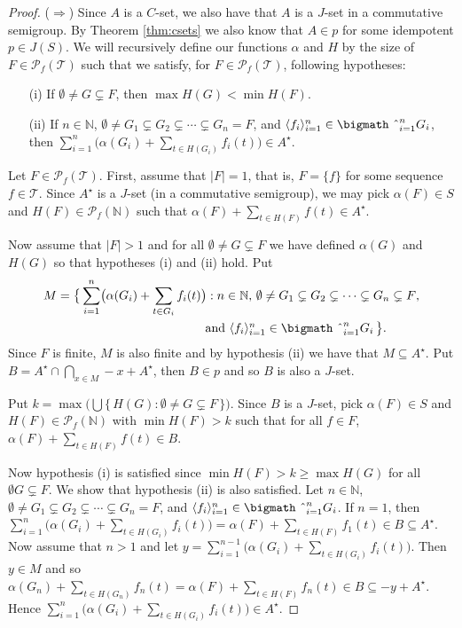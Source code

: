 \documentclass[12pt]{article}
\theoremstyle{plain}
\theoremstyle{definition}
\newcommand{\la}{\langle}
\newcommand{\ra}{\rangle}
\newcommand{\bbN}{\mathbb{N}}
\newcommand{\calT}{\mathcal{T}}
\newcommand{\Pf}{\mathcal{P}_f}
\newcommand{\bigtimes}{\hbox{\bigmath \char'2}}
\begin{document}
\begin{proof}
  ($\Rightarrow$)
  Since $A$ is a $C$-set, we also have that $A$ is a $J$-set in a commutative semigroup.
  By Theorem \ref{thm:csets} we also know that $A \in p$ for some idempotent $p \in J(S)$. 
  We will recursively define our functions $\alpha$ and $H$ by the size of $F \in \Pf(\calT)$ such that we satisfy, for $F \in \Pf(\calT)$, following hypotheses:
  \begin{itemize}
    \item[(i)] If $\emptyset \ne G \subsetneq F$, then $\max H(G) < \min H(F)$.
      
    \item[(ii)] If $n \in \bbN$, $\emptyset \ne G_1 \subsetneq G_2 \subsetneq \cdots \subsetneq G_n = F$, and $\la f_i \ra_{i=1}^n \in \bigtimes_{i=1}^n G_i$, then $\sum_{i=1}^n\bigl( \alpha(G_i) + \sum_{t \in H(G_i)} f_i(t)\bigr) \in A^\star$. 
  \end{itemize}
  
  Let $F \in \Pf(\calT)$.
  First, assume that $|F| = 1$, that is, $F = \{f\}$ for some sequence $f \in \calT$.
  Since $A^\star$ is a $J$-set (in a commutative semigroup), we may pick $\alpha(F) \in S$ and $H(F) \in \Pf(\bbN)$ such that $\alpha(F) + \sum_{t \in H(F)} f(t) \in A^\star$.

  Now assume that $|F| > 1$ and for all $\emptyset \ne G \subsetneq F$ we have defined $\alpha(G)$ and $H(G)$ so that hypotheses (i) and (ii) hold.
  Put
  \begin{align*}
    M &= \bigl\{\, \sum_{i=1}^n \bigl( \alpha(G_i) + \sum_{t \in G_i} f_i(t) \bigr) : \mbox{$n \in \bbN$, $\emptyset \ne G_1 \subsetneq G_2 \subsetneq \cdots \subsetneq G_n \subsetneq F$,} \\
    &\hspace{12em} \mbox{and $\la f_i \ra_{i=1}^n \in \bigtimes_{i=1}^n G_i$} \,\bigr\}.
  \end{align*}
  Since $F$ is finite, $M$ is also finite and by hypothesis (ii) we have that $M \subseteq A^\star$.
  Put $B = A^\star \cap \bigcap_{x \in M} -x+A^\star$, then $B \in p$ and so $B$ is also a $J$-set.

  Put $k = \max \bigl( \bigcup\{\, H(G) : \emptyset \ne G \subsetneq F\,\} \bigr)$.
  Since $B$ is a $J$-set, pick $\alpha(F) \in S$ and $H(F) \in \Pf(\bbN)$ with $\min H(F) > k$ such that for all $f \in F$, $\alpha(F) + \sum_{t \in H(F)} f(t) \in B$. 

  Now hypothesis (i) is satisfied since $\min H(F) > k \ge \max H(G)$ for all $\emptyset G \subsetneq F$. 
  We show that hypothesis (ii) is also satisfied.
  Let $n \in \bbN$, $\emptyset \ne G_1 \subsetneq G_2 \subsetneq \cdots \subsetneq G_n = F$, and $\la f_i \ra_{i=1}^n \in \bigtimes_{i=1}^n G_i$. 
  If $n = 1$, then $\sum_{i=1}^n \bigl( \alpha(G_i) + \sum_{t \in H(G_i)} f_i(t)\bigr) = \alpha(F) + \sum_{t \in H(F)} f_1(t) \in B \subseteq A^\star$. 
  Now assume that $n > 1$ and let $y = \sum_{i=1}^{n-1}\bigl( \alpha(G_i) + \sum_{t \in H(G_i)} f_i(t) \bigr)$.
  Then $y \in M$ and so $\alpha(G_n) + \sum_{t \in H(G_n)} f_n(t) = \alpha(F) + \sum_{t \in H(F)} f_n(t) \in B \subseteq -y + A^\star$. 
  Hence $\sum_{i=1}^n\bigl( \alpha(G_i) + \sum_{t \in H(G_i)} f_i(t) \bigr) \in A^\star$.


\end{proof}
\end{document}
